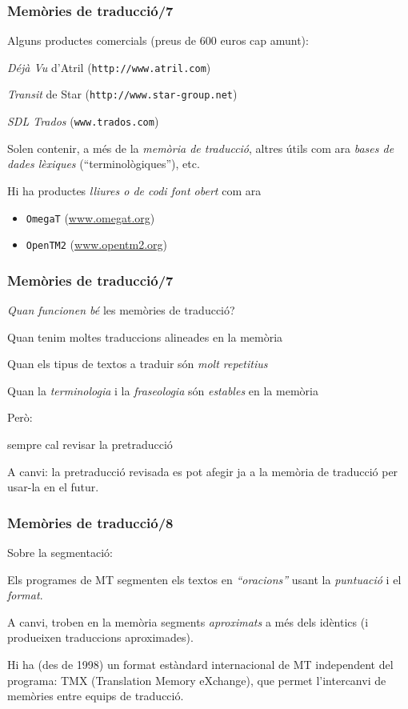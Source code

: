\documentclass{beamer}
\newcommand{\empha}[1]{\emph{#1}\/}
\begin{document}
\begin{frame}

\frametitle{ Memòries de traducció/7}
{
{Alguns productes comercials (preus de 600 euros cap amunt):}
\begin{itemize}\setlength{\itemsep}{0pt}
{\item \empha{Déjà Vu} d'Atril (\texttt{http://www.atril.com}) }
{\item \empha{Transit} de Star
  (\texttt{http://www.star-group.net})}
{\item \empha{SDL Trados} (\texttt{www.trados.com})}
\end{itemize}
{Solen contenir, a més de la \empha{memòria de traducció}, altres
útils com ara \empha{bases de dades lèxiques} (``terminològiques''), etc.}

Hi ha productes \empha{lliures o de codi font obert} com ara 
  \begin{itemize}
  \item \texttt{OmegaT} (\url{www.omegat.org})
  \item \texttt{OpenTM2} (\url{www.opentm2.org})
  \end{itemize}
}

\end{frame}


\begin{frame}

\frametitle{ Memòries de traducció/7}
{
{\empha{Quan funcionen bé} les memòries de 
traducció?}
\begin{itemize}\setlength{\itemsep}{0pt}
{\item Quan tenim moltes traduccions alineades en la memòria}
{\item Quan els tipus de textos a traduir són 
\empha{molt repetitius}}
{\item Quan la \empha{terminologia} i la \empha{fraseologia} són 
\empha{estables} en la memòria}
\end{itemize}
{Però:}
\begin{itemize}\setlength{\itemsep}{0pt}
{\item  sempre cal revisar la pretraducció}
{\item A canvi: la pretraducció revisada es pot 
afegir ja a la memòria de traducció per usar-la en el futur.}
\end{itemize}
}
\end{frame}


\begin{frame}
\frametitle{ Memòries de traducció/8}
{
{Sobre la segmentació:}
\begin{itemize}\setlength{\itemsep}{0pt}
{\item Els programes de MT segmenten els textos en 
\empha{``oracions''} usant la \empha{puntuació} i el \empha{format}.}
{\item A canvi, troben en la memòria segments \empha{aproximats} a 
més dels idèntics (i produeixen traduccions aproximades).}
{\item Hi ha (des de 1998) un format estàndard internacional
de MT independent del programa: TMX 
(Translation Memory eXchange), que permet l'intercanvi de memòries
entre equips de traducció.}
\end{itemize}
}
\end{frame}
\end{document}
